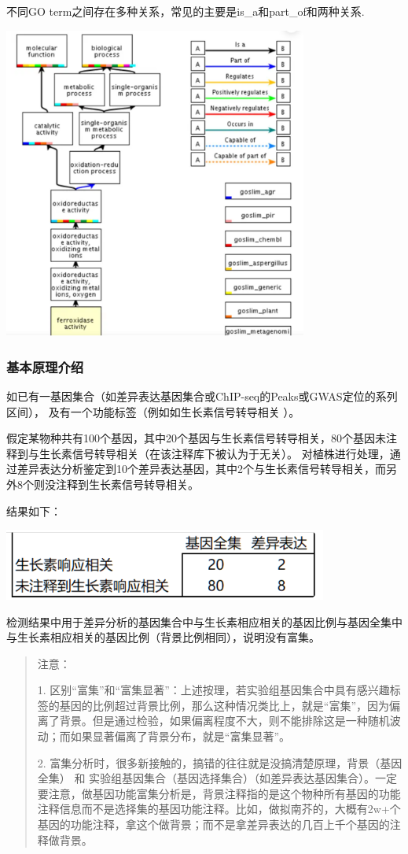 不同GO term之间存在多种关系，常见的主要是is\_a和part\_of和两种关系.

\includegraphics[width=0.75\textwidth]{./image/gdk/8.2.2.png}

\subsubsection{基本原理介绍}
如已有一基因集合（如差异表达基因集合或ChIP-seq的Peaks或GWAS定位的系列区间），
及有一个功能标签（例如如生长素信号转导相关 ）。

假定某物种共有100个基因，其中20个基因与生长素信号转导相关，80个基因未注释到与生长素信号转导相关（在该注释库下被认为于无关）。
对植株进行处理，通过差异表达分析鉴定到10个差异表达基因，其中2个与生长素信号转导相关，而另外8个则没注释到生长素信号转导相关。

结果如下：

\includegraphics[width=0.8\textwidth]{./image/gdk/8.2.3.png}

检测结果中用于差异分析的基因集合中与生长素相应相关的基因比例与基因全集中与生长素相应相关的基因比例（背景比例相同），说明没有富集。

\begin{quotation}
    注意：

    1. 区别“富集”和“富集显著”：上述按理，若实验组基因集合中具有感兴趣标签的基因的比例超过背景比例，那么这种情况类比上，就是“富集”，因为偏离了背景。但是通过检验，如果偏离程度不大，则不能排除这是一种随机波动；而如果显著偏离了背景分布，就是“富集显著”。
    
    2. 富集分析时，很多新接触的，搞错的往往就是没搞清楚原理，背景（基因全集） 和 实验组基因集合（基因选择集合）（如差异表达基因集合）。一定要注意，做基因功能富集分析是，背景注释指的是这个物种所有基因的功能注释信息而不是选择集的基因功能注释。比如，做拟南芥的，大概有2w+个基因的功能注释，拿这个做背景；而不是拿差异表达的几百上千个基因的注释做背景。
\end{quotation}

